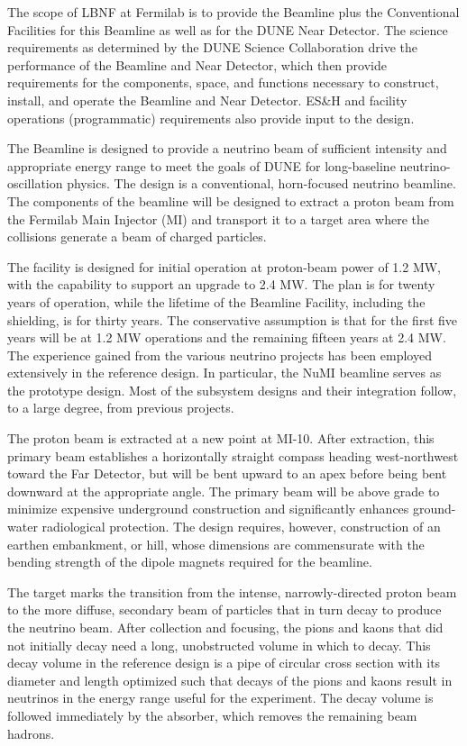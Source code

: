 The scope of LBNF at Fermilab is to provide the Beamline plus the Conventional Facilities for this Beamline as well as for the DUNE Near Detector. The science requirements as determined by the DUNE Science Collaboration drive the performance of the Beamline and Near Detector, which then provide requirements for the components, space, and functions necessary to construct, install, and operate the Beamline and Near Detector. ES\&H and facility operations (programmatic) requirements also provide input to the design.

The Beamline is designed to provide a neutrino beam of sufficient intensity and appropriate energy range to meet the goals of DUNE for long-baseline neutrino-oscillation physics. The design is a conventional, horn-focused neutrino beamline. The components of the beamline will be designed to extract a proton beam from the Fermilab Main Injector (MI) and transport it to a target area where the collisions generate a beam of charged particles. 

The facility is designed for initial operation at proton-beam power of 1.2 MW, with the capability to support an upgrade to 2.4 MW. The plan is for twenty years of operation, while the lifetime of the Beamline Facility, including the shielding, is for thirty years. The conservative assumption is that for the first five years will be at 1.2 MW operations and the remaining fifteen years at 2.4 MW.  
The experience gained from the various neutrino projects has been employed extensively in the reference design. In particular, the NuMI beamline serves as the prototype design. Most of the subsystem designs and their integration follow, to a large degree, from previous projects. 

The proton beam is extracted at a new point at MI-10. After extraction, this primary beam establishes a horizontally straight compass heading west-northwest toward the Far Detector, but will be bent upward to an apex before being bent downward at the appropriate angle. The primary beam will be above grade to minimize expensive underground construction and significantly enhances ground-water radiological protection. The design requires, however, construction of an earthen embankment, or hill, whose dimensions are commensurate with the bending strength of the dipole magnets required for the beamline. 

The target marks the transition from the intense, narrowly-directed proton beam to the more diffuse, secondary beam of particles that in turn decay to produce the neutrino beam. After collection and focusing, the pions and kaons that did not initially decay need a long, unobstructed volume in which to decay. This decay volume in the reference design is a pipe of circular cross section with its diameter and length optimized such that decays of the pions and kaons result in neutrinos in the energy range useful for the experiment. The decay volume is followed immediately by the absorber, which removes the remaining beam hadrons. 

